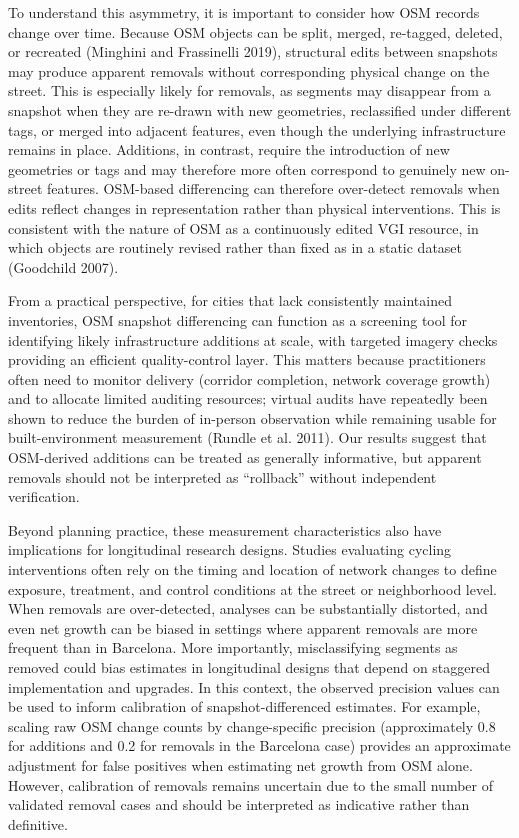 \documentclass[
]{article}
\begin{document}
To understand this asymmetry, it is important to consider how OSM
records change over time. Because OSM objects can be split, merged,
re-tagged, deleted, or recreated (Minghini and Frassinelli 2019),
structural edits between snapshots may produce apparent removals without
corresponding physical change on the street. This is especially likely
for removals, as segments may disappear from a snapshot when they are
re-drawn with new geometries, reclassified under different tags, or
merged into adjacent features, even though the underlying infrastructure
remains in place. Additions, in contrast, require the introduction of
new geometries or tags and may therefore more often correspond to
genuinely new on-street features. OSM-based differencing can therefore
over-detect removals when edits reflect changes in representation rather
than physical interventions. This is consistent with the nature of OSM
as a continuously edited VGI resource, in which objects are routinely
revised rather than fixed as in a static dataset (Goodchild 2007).

From a practical perspective, for cities that lack consistently
maintained inventories, OSM snapshot differencing can function as a
screening tool for identifying likely infrastructure additions at scale,
with targeted imagery checks providing an efficient quality-control
layer. This matters because practitioners often need to monitor delivery
(corridor completion, network coverage growth) and to allocate limited
auditing resources; virtual audits have repeatedly been shown to reduce
the burden of in-person observation while remaining usable for
built-environment measurement (Rundle et al. 2011). Our results suggest
that OSM-derived additions can be treated as generally informative, but
apparent removals should not be interpreted as ``rollback'' without
independent verification.

Beyond planning practice, these measurement characteristics also have
implications for longitudinal research designs. Studies evaluating
cycling interventions often rely on the timing and location of network
changes to define exposure, treatment, and control conditions at the
street or neighborhood level. When removals are over-detected, analyses
can be substantially distorted, and even net growth can be biased in
settings where apparent removals are more frequent than in Barcelona.
More importantly, misclassifying segments as removed could bias
estimates in longitudinal designs that depend on staggered
implementation and upgrades. In this context, the observed precision
values can be used to inform calibration of snapshot-differenced
estimates. For example, scaling raw OSM change counts by change-specific
precision (approximately 0.8 for additions and 0.2 for removals in the
Barcelona case) provides an approximate adjustment for false positives
when estimating net growth from OSM alone. However, calibration of
removals remains uncertain due to the small number of validated removal
cases and should be interpreted as indicative rather than definitive.
\end{document}
